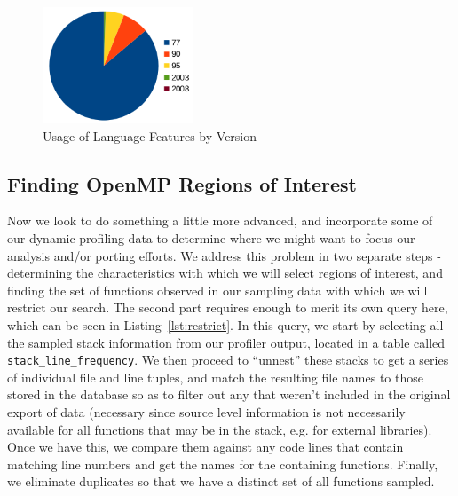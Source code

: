 \begin{figure}
\begin{center}
\includegraphics[width=0.4\textwidth]{images/cp2k-fortran-versions.png}
\end{center}
\caption{Usage of Language Features by Version}
\label{fig:fortran-versions}
\end{figure}

\subsection{Finding OpenMP Regions of Interest}
Now we look to do something a little more advanced, and incorporate some of our dynamic profiling data to determine where we might want to focus our analysis and/or porting efforts.
We address this problem in two separate steps - determining the characteristics with which we will select regions of interest, and finding the set of functions observed in our sampling data with which we will restrict our search.
The second part requires enough to merit its own query here, which can be seen in Listing~\ref{lst:restrict}.
In this query, we start by selecting all the sampled stack information from our profiler output, located in a table called \texttt{stack\_line\_frequency}.
We then proceed to ``unnest'' these stacks to get a series of individual file and line tuples, and match the resulting file names to those stored in the database so as to filter out any that weren't included in the original export of data (necessary since source level information is not necessarily available for all functions that may be in the stack, e.g. for external libraries).
Once we have this, we compare them against any code lines that contain matching line numbers and get the names for the containing functions.
Finally, we eliminate duplicates so that we have a distinct set of all functions sampled.

